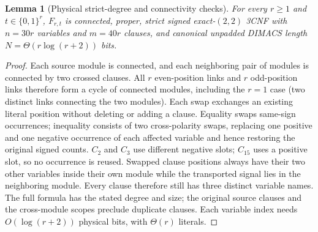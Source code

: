 \documentclass[11pt]{article}
\newtheorem{lemma}[theorem]{Lemma}
\begin{document}
\begin{lemma}[Physical strict-degree and connectivity checks]
For every $r\ge1$ and $t\in\{0,1\}^r$, $F_{r,t}$ is connected, proper, strict signed exact-$(2,2)$ 3CNF with $n=30r$ variables and $m=40r$ clauses, and canonical unpadded DIMACS length $N=\Theta(r\log(r+2))$ bits.
\end{lemma}
\begin{proof}
Each source module is connected, and each neighboring pair of modules is connected by two crossed clauses. All $r$ even-position links and $r$ odd-position links therefore form a cycle of connected modules, including the $r=1$ case (two distinct links connecting the two modules). Each swap exchanges an existing literal position without deleting or adding a clause. Equality swaps same-sign occurrences; inequality consists of two cross-polarity swaps, replacing one positive and one negative occurrence of each affected variable and hence restoring the original signed counts. $C_2$ and $C_3$ use different negative slots; $C_{15}$ uses a positive slot, so no occurrence is reused. Swapped clause positions always have their two other variables inside their own module while the transported signal lies in the neighboring module. Every clause therefore still has three distinct variable names. The full formula has the stated degree and size; the original source clauses and the cross-module scopes preclude duplicate clauses. Each variable index needs $O(\log(r+2))$ physical bits, with $\Theta(r)$ literals.
\end{proof}
\end{document}
